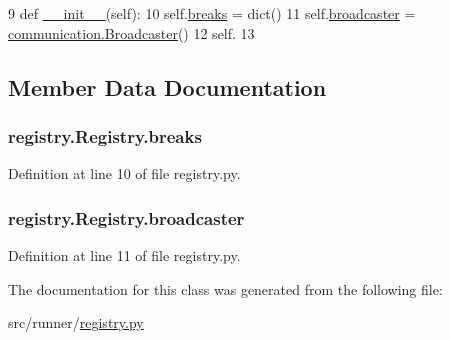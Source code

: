 \begin{DoxyCode}
9     \textcolor{keyword}{def }\hyperlink{classregistry_1_1Registry_a0de756c86ae592274dbffe0a492e3ffa}{\_\_init\_\_}(self):
10         self.\hyperlink{classregistry_1_1Registry_a66343b78f91d5c6c1a91c8efa72f3110}{breaks} = dict()
11         self.\hyperlink{classregistry_1_1Registry_ab905ffd5043d5073eb4571b8db513399}{broadcaster} = \hyperlink{classcommunication_1_1Broadcaster}{communication.Broadcaster}()
12         self.
13 \end{DoxyCode}


\subsection{Member Data Documentation}
\hypertarget{classregistry_1_1Registry_a66343b78f91d5c6c1a91c8efa72f3110}{}
\subsubsection[{breaks}]{\setlength{\rightskip}{0pt plus 5cm}registry.\+Registry.\+breaks}\label{classregistry_1_1Registry_a66343b78f91d5c6c1a91c8efa72f3110}


Definition at line 10 of file registry.\+py.

\hypertarget{classregistry_1_1Registry_ab905ffd5043d5073eb4571b8db513399}{}
\subsubsection[{broadcaster}]{\setlength{\rightskip}{0pt plus 5cm}registry.\+Registry.\+broadcaster}\label{classregistry_1_1Registry_ab905ffd5043d5073eb4571b8db513399}


Definition at line 11 of file registry.\+py.



The documentation for this class was generated from the following file\+:\begin{DoxyCompactItemize}
\item 
src/runner/\hyperlink{registry_8py}{registry.\+py}\end{DoxyCompactItemize}
